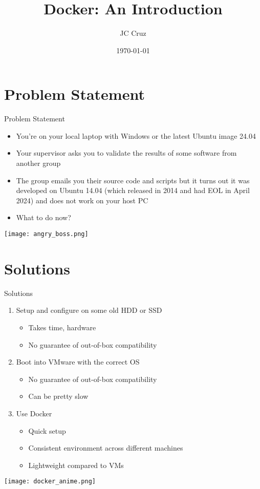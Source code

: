 \documentclass{beamer}
\title{Docker: An Introduction}
\author{JC Cruz}
\date{\today}
\begin{document}
\frame{\titlepage}

\section{Problem Statement}

\begin{frame}{Problem Statement}
    \begin{itemize}
        \item You're on your local laptop with Windows or the latest Ubuntu image 24.04
        \item Your supervisor asks you to validate the results of some software from another group
        \item The group emails you their source code and scripts but it turns out it was developed on Ubuntu 14.04 (which released in 2014 and had EOL in April 2024) and does not work on your host PC
        \item What to do now?
    \end{itemize}
    \texttt{[image: angry\_boss.png]}
\end{frame}

\section{Solutions}

\begin{frame}{Solutions}
    \begin{enumerate}
        \item Setup and configure on some old HDD or SSD
        \begin{itemize}
            \item Takes time, hardware
            \item No guarantee of out-of-box compatibility
        \end{itemize}
        \item Boot into VMware with the correct OS
        \begin{itemize}
            \item No guarantee of out-of-box compatibility
            \item Can be pretty slow
        \end{itemize}
        \item Use Docker
        \begin{itemize}
            \item Quick setup
            \item Consistent environment across different machines
            \item Lightweight compared to VMs
        \end{itemize}
    \end{enumerate}
    \texttt{[image: docker\_anime.png]}
\end{frame}
\end{document}
